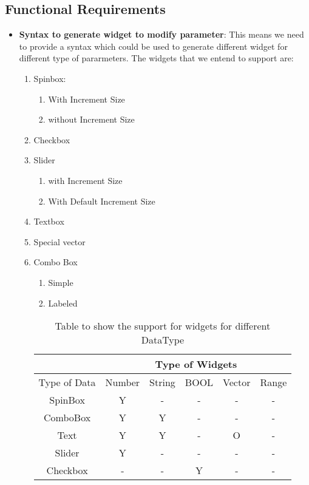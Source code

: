 \subsection{Functional Requirements}
\begin{itemize}
	\item {\bf Syntax to generate widget to modify parameter}: This means we need to provide a syntax which could be used to generate different widget for different type of pararmeters.
	The widgets that we entend to support are: 
	\begin{enumerate} 
		\item Spinbox:
			\begin{enumerate}
				\item With Increment Size
				\item without Increment Size 
			\end{enumerate} 
		\item Checkbox 
		\item Slider
			\begin{enumerate}
				\item with Increment Size
				\item With Default Increment Size
			\end{enumerate}
		\item Textbox
		\item Special vector 
		\item Combo Box
			\begin{enumerate}
				\item Simple
				\item Labeled 
			\end{enumerate}
	
	\begin{table}[h]
		\centering
		\begin{tabular}{ |c|c|c|c|c|c| }
			\hline
			& \multicolumn{5}{|c|}{Type of Widgets} \\
			\hline
			Type of Data&	Number&	String&	BOOL &Vector &Range	 \\ [0.5ex]
			\hline 
			SpinBox&Y&	-&	-&	-&	- \\ \hline
			ComboBox&	Y&	Y&	-&	-&	- \\ \hline
			Text&	Y&	Y&	-&	O&	- \\ \hline
			Slider&	Y&	-&	-&	-&	- \\ \hline
			Checkbox&	-&	-&	Y&	-&	- \\ [1ex]
			\hline
		\end{tabular}
		\caption{Table to show the support for widgets for different DataType}
		\label{table2}
	\end{table}
	

\end{enumerate}
\end{itemize}
